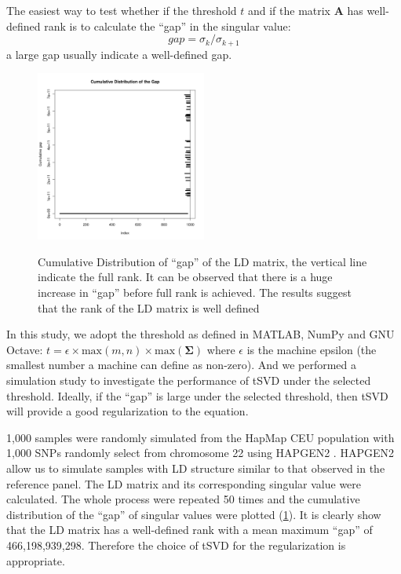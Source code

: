 			The easiest way to test whether if the threshold $t$ and if the matrix $\boldsymbol{A}$ has well-defined rank is to calculate the ``gap'' in the singular value:
			\begin{equation}
			gap = \sigma_k/\sigma_{k+1}
			\label{eq:gapSingular}
			\end{equation}
			a large gap usually indicate a well-defined gap. 
			\begin{figure}
				\caption[Cumulative Distribution of ``gap'' of the LD matrix]{Cumulative Distribution of ``gap'' of the LD matrix, the vertical line indicate the full rank. It can be observed that there is a huge increase in ``gap'' before full rank is achieved. 
				The results suggest that the rank of the LD matrix is well defined}
				\centering
				\includegraphics[width=0.5\textwidth]{figure/singular_value_distribution.png}
				\label{fig:singularValueDist}
				\vspace{-20pt}
			\end{figure}
			In this study, we adopt the threshold as defined in MATLAB, NumPy and GNU Octave: $t=\epsilon\times\mathrm{max}(m,n)\times\mathrm{max}(\boldsymbol{\Sigma})$ where $\epsilon$ is the machine epsilon (the smallest number a machine can define as non-zero). 
			And we performed a simulation study to investigate the performance of \gls{tSVD} under the selected threshold.
			Ideally, if the ``gap'' is large under the selected threshold, then \gls{tSVD} will provide a good regularization to the equation. 
			
			1,000 samples were randomly simulated from the HapMap \citep{Altshuler2010} \gls{CEU} population with 1,000 \glspl{SNP} randomly select from chromosome 22 using HAPGEN2 \citep{Su2011}.
			HAPGEN2 allow us to simulate samples with \gls{LD} structure similar to that observed in the reference panel.
			The \gls{LD} matrix and its corresponding singular value were calculated. 
			The whole process were repeated 50 times and the cumulative distribution of the ``gap'' of singular values were plotted (\cref{fig:singularValueDist}). 
			It is clearly show that the \gls{LD} matrix has a well-defined rank with a mean maximum ``gap'' of 466,198,939,298.
			Therefore the choice of \gls{tSVD} for the regularization is appropriate.
			
